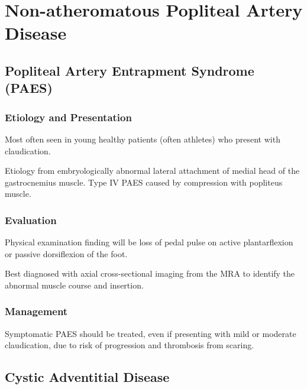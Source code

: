 \documentclass[
]{book}
\begin{document}
\hypertarget{non-atheromatous-popliteal-artery-disease}{%
\section{Non-atheromatous Popliteal Artery Disease}\label{non-atheromatous-popliteal-artery-disease}}

\hypertarget{popliteal-artery-entrapment-syndrome-paes}{%
\subsection{Popliteal Artery Entrapment Syndrome (PAES)}\label{popliteal-artery-entrapment-syndrome-paes}}

\hypertarget{etiology-and-presentation-2}{%
\subsubsection{Etiology and Presentation}\label{etiology-and-presentation-2}}

Most often seen in young healthy patients (often athletes) who present
with claudication.

Etiology from embryologically abnormal lateral attachment of medial head
of the gastrocnemius muscle.\citep{gokkus2014, lejay2014} Type IV PAES
caused by compression with popliteus muscle.

\hypertarget{evaluation-14}{%
\subsubsection{Evaluation}\label{evaluation-14}}

Physical examination finding will be loss of pedal pulse on active
plantarflexion or passive dorsiflexion of the foot.\citep{gokkus2014, lejay2014}

Best diagnosed with axial cross-sectional imaging from the MRA to
identify the abnormal muscle course and insertion. \citep{sinha2012, lejay2014}

\hypertarget{management-21}{%
\subsubsection{Management}\label{management-21}}

Symptomatic PAES should be treated, even if presenting with mild or
moderate claudication, due to risk of progression and thrombosis from
scaring.\citep{forbes2019}

\hypertarget{cystic-adventitial-disease}{%
\subsection{Cystic Adventitial Disease}\label{cystic-adventitial-disease}}
\end{document}
